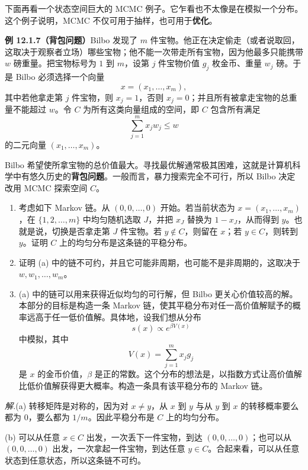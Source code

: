 \documentclass[UTF8, 12pt, fontset=fandol, oneside]{ctexart}
\begin{document}
下面再看一个状态空间巨大的 MCMC 例子。它乍看也不太像是在模拟一个分布。这个例子说明，MCMC 不仅可用于抽样，也可用于\textbf{优化}。

\noindent\textbf{例 12.1.7（背包问题）}\quad Bilbo 发现了 $m$ 件宝物。他正在决定偷走（或者说取回，这取决于观察者立场）哪些宝物；他不能一次带走所有宝物，因为他最多只能携带 $w$ 磅重量。把宝物标号为 $1$ 到 $m$，设第 $j$ 件宝物价值 $g_j$ 枚金币、重量 $w_j$ 磅。于是 Bilbo 必须选择一个向量
\[
  x=(x_1,\ldots,x_m),
\]
其中若他拿走第 $j$ 件宝物，则 $x_j=1$，否则 $x_j=0$；并且所有被拿走宝物的总重量不能超过 $w$。令 $C$ 为所有这类向量组成的空间，即 $C$ 包含所有满足
\[
  \sum_{j=1}^{m}x_jw_j\le w
\]
的二元向量 $(x_1,\ldots,x_m)$。

Bilbo 希望使所拿宝物的总价值最大。寻找最优解通常极其困难，这就是计算机科学中有悠久历史的\textbf{背包问题}。一般而言，暴力搜索完全不可行，所以 Bilbo 决定改用 MCMC 探索空间 $C$。

\begin{enumerate}
  \item[(a)] 考虑如下 Markov 链。从 $(0,0,\ldots,0)$ 开始。若当前状态为 $x=(x_1,\ldots,x_m)$，在 $\{1,2,\ldots,m\}$ 中均匀随机选取 $J$，并把 $x_J$ 替换为 $1-x_J$，从而得到 $y$。也就是说，切换是否拿走第 $J$ 件宝物。若 $y\notin C$，则留在 $x$；若 $y\in C$，则转到 $y$。证明 $C$ 上的均匀分布是这条链的平稳分布。

  \item[(b)] 证明 (a) 中的链不可约，并且它可能非周期，也可能不是非周期的，这取决于 $w,w_1,\ldots,w_m$。

  \item[(c)] (a) 中的链可以用来获得近似均匀的可行解，但 Bilbo 更关心价值较高的解。本部分的目标是构造一条 Markov 链，使其平稳分布对任一高价值解赋予的概率远高于任一低价值解。具体地，设我们想从分布
  \[
    s(x)\propto e^{\beta V(x)}
  \]
  中模拟，其中
  \[
    V(x)=\sum_{j=1}^{m}x_jg_j
  \]
  是 $x$ 的金币价值，$\beta$ 是正的常数。这个分布的想法是，以指数方式让高价值解比低价值解获得更大概率。构造一条具有该平稳分布的 Markov 链。
\end{enumerate}

\noindent\textit{解.}\quad (a) 转移矩阵是对称的，因为对 $x\ne y$，从 $x$ 到 $y$ 与从 $y$ 到 $x$ 的转移概率要么都为 $0$，要么都为 $1/m$。因此平稳分布是 $C$ 上的均匀分布。

(b) 可以从任意 $x\in C$ 出发，一次丢下一件宝物，到达 $(0,0,\ldots,0)$；也可以从 $(0,0,\ldots,0)$ 出发，一次拿起一件宝物，到达任意 $y\in C$。合起来看，可以从任意状态到任意状态，所以这条链不可约。
\end{document}
